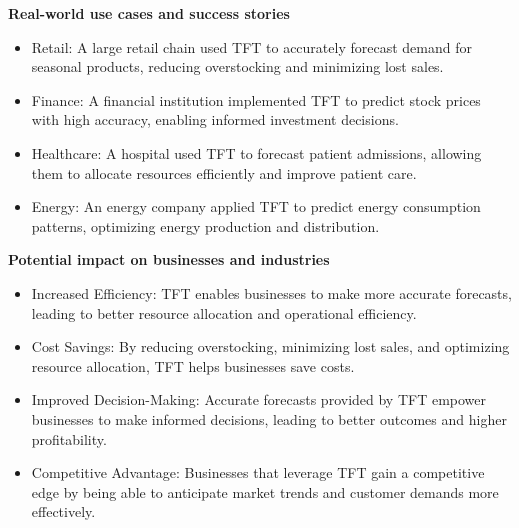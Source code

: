 \begin{frame}
			\textbf{Real-world use cases and success stories}
		\begin{itemize}
			\item Retail: A large retail chain used TFT to accurately forecast demand for seasonal products, reducing overstocking and minimizing lost sales.
			\item Finance: A financial institution implemented TFT to predict stock prices with high accuracy, enabling informed investment decisions.
			\item Healthcare: A hospital used TFT to forecast patient admissions, allowing them to allocate resources efficiently and improve patient care.
			\item Energy: An energy company applied TFT to predict energy consumption patterns, optimizing energy production and distribution.
		\end{itemize}
			\end{frame}
			
			\begin{frame}
			\textbf{Potential impact on businesses and industries}
	\begin{itemize}
		\item Increased Efficiency: TFT enables businesses to make more accurate forecasts, leading to better resource allocation and operational efficiency.
		\item Cost Savings: By reducing overstocking, minimizing lost sales, and optimizing resource allocation, TFT helps businesses save costs.
		\item Improved Decision-Making: Accurate forecasts provided by TFT empower businesses to make informed decisions, leading to better outcomes and higher profitability.
		\item Competitive Advantage: Businesses that leverage TFT gain a competitive edge by being able to anticipate market trends and customer demands more effectively.
	\end{itemize}
	\end{frame}
	
			


